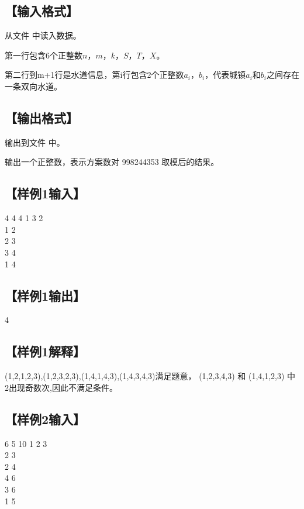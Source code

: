 \documentclass{statement}
\begin{document}
	
   	

    \subsection[输入格式]{【输入格式】}
    从文件  中读入数据。\par
	第一行包含6个正整数$n$，$m$，$k$，$S$，$T$，$X$。
	
	第二行到m+1行是水道信息，第i行包含2个正整数$a_{i}$，$b_{i}$，代表城镇$a_{i}$和$b_{i}$之间存在一条双向水道。

    
    \subsection[输出格式]{【输出格式】}
    输出到文件  中。

	输出一个正整数，表示方案数对 998244353 取模后的结果。
    
    \subsection[样例1输入]{【样例1输入】}
    \begin{example}
4 4 4 1 3 2\\
1 2\\
2 3\\
3 4\\
1 4
    \end{example}

    \subsection[样例1输出]{【样例1输出】}
    \begin{example}
4
    \end{example}
   \subsection[样例1解释]{【样例1解释】}
   (1,2,1,2,3),(1,2,3,2,3),(1,4,1,4,3),(1,4,3,4,3)满足题意，
   (1,2,3,4,3) 和 (1,4,1,2,3) 中2出现奇数次,因此不满足条件。
    \subsection[样例2输入]{【样例2输入】}
\begin{example}
6 5 10 1 2 3\\
2 3\\
2 4\\
4 6\\
3 6\\
1 5
\end{example}
\end{document}
